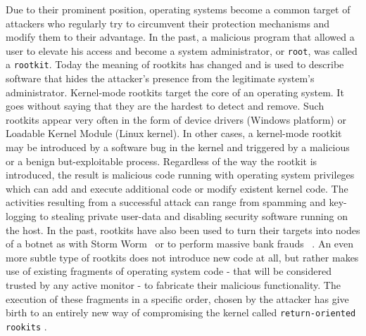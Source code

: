 Due to their prominent position, operating systems become a common target of attackers who regularly try to circumvent their protection mechanisms and modify them to their advantage. In the past, a malicious program that allowed a user to elevate his access and become a system administrator, or \texttt{root}, was called a \texttt{rootkit}. Today the meaning of rootkits has changed and is used to describe software that hides the attacker's presence from the legitimate system's administrator. 
Kernel-mode rootkits target the core of an operating system. It goes without saying that they are the hardest to detect and remove. Such rootkits appear very often in the form of device drivers (Windows platform) or Loadable Kernel Module (Linux kernel). 
In other cases, a kernel-mode rootkit may be introduced by a software bug in the kernel and  triggered by a malicious or a benign but-exploitable process.
Regardless of the way the rootkit is introduced, the result is malicious code running with operating system privileges which can add and execute additional code or modify existent kernel code. The activities resulting from a successful attack can range from spamming and key-logging to stealing private user-data and disabling security software running on the host.
In the past, rootkits have also been used to turn their targets into nodes of a botnet as with Storm Worm~\cite{1387718} or to perform massive bank frauds ~\cite{mcaffee}.
An even more subtle type of rootkits does not introduce new code at all, but rather makes use of existing fragments of operating system code - that will be considered trusted by any active monitor - to fabricate their malicious functionality. The execution of these fragments in a specific order, chosen by the attacker has give birth to an entirely new way of compromising the kernel called \texttt{return-oriented rookits} \cite{Hund2009}. 


